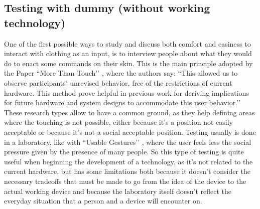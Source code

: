 \documentclass{sigchi}
\begin{document}
\subsection{Testing with dummy (without working technology)}
One of the first possible ways to study and discuss both comfort and easiness  to interact with clothing as an input, is to interview people about what they would do to enact some commands on their skin. This is the main principle adopted by the Paper ``More Than Touch’’ \cite[p. 181]{more-touch}, where the authors say: ``This allowed us to observe participants’ unrevised behavior, free of the restrictions of current hardware. This method prove helpful in previous work for deriving implications for future hardware and system designs to accommodate this user behavior.’’
These research types allow to have a common ground, as they help defining areas where the touching is not possible, either because it’s a position not easily acceptable or because it’s not a social acceptable position. Testing usually is done in a laboratory, like with ``Usable Gestures’’ \cite{usable-gesture}, where the user feels less the social pressure given by the presence of many people. So this type of testing is quite useful when beginning the development of a technology, as it’s not related to the current hardware, but has some limitations both because it doesn’t consider the necessary tradeoffs that must be made to go from the idea of the device to the actual working device and because the laboratory itself doesn’t reflect the everyday situation that a person and a device will encounter on.
\end{document}
